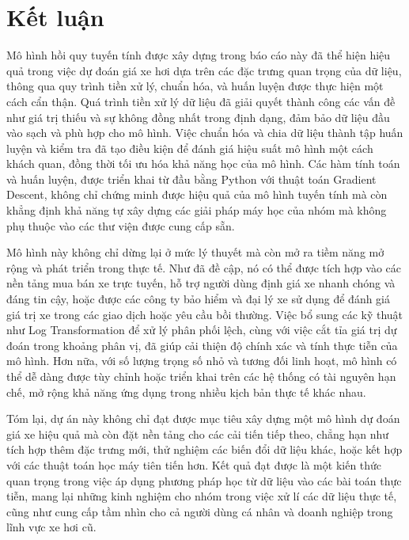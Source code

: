 \chapter{Kết luận}
\label{Chapter3}
\setcounter{secnumdepth}{5}

Mô hình hồi quy tuyến tính được xây dựng trong báo cáo này đã thể hiện hiệu quả trong việc dự đoán giá xe hơi dựa trên các đặc trưng quan trọng của dữ liệu, thông qua quy trình tiền xử lý, chuẩn hóa, và huấn luyện được thực hiện một cách cẩn thận. Quá trình tiền xử lý dữ liệu đã giải quyết thành công các vấn đề như giá trị thiếu và sự không đồng nhất trong định dạng, đảm bảo dữ liệu đầu vào sạch và phù hợp cho mô hình. Việc chuẩn hóa và chia dữ liệu thành tập huấn luyện và kiểm tra đã tạo điều kiện để đánh giá hiệu suất mô hình một cách khách quan, đồng thời tối ưu hóa khả năng học của mô hình. Các hàm tính toán và huấn luyện, được triển khai từ đầu bằng Python với thuật toán Gradient Descent, không chỉ chứng minh được hiệu quả của mô hình tuyến tính mà còn khẳng định khả năng tự xây dựng các giải pháp máy học của nhóm mà không phụ thuộc vào các thư viện được cung cấp sẵn.

Mô hình này không chỉ dừng lại ở mức lý thuyết mà còn mở ra tiềm năng mở rộng và phát triển trong thực tế. Như đã đề cập, nó có thể được tích hợp vào các nền tảng mua bán xe trực tuyến, hỗ trợ người dùng định giá xe nhanh chóng và đáng tin cậy, hoặc được các công ty bảo hiểm và đại lý xe sử dụng để đánh giá giá trị xe trong các giao dịch hoặc yêu cầu bồi thường. Việc bổ sung các kỹ thuật như Log Transformation để xử lý phân phối lệch, cùng với việc cắt tỉa giá trị dự đoán trong khoảng phân vị, đã giúp cải thiện độ chính xác và tính thực tiễn của mô hình. Hơn nữa, với số lượng trọng số nhỏ và tương đối linh hoạt, mô hình có thể dễ dàng được tùy chỉnh hoặc triển khai trên các hệ thống có tài nguyên hạn chế, mở rộng khả năng ứng dụng trong nhiều kịch bản thực tế khác nhau.

Tóm lại, dự án này không chỉ đạt được mục tiêu xây dựng một mô hình dự đoán giá xe hiệu quả mà còn đặt nền tảng cho các cải tiến tiếp theo, chẳng hạn như tích hợp thêm đặc trưng mới, thử nghiệm các biến đổi dữ liệu khác, hoặc kết hợp với các thuật toán học máy tiên tiến hơn. Kết quả đạt được là một kiến thức quan trọng trong việc áp dụng phương pháp học từ dữ liệu vào các bài toán thực tiễn, mang lại những kinh nghiệm cho nhóm trong việc xử lí các dữ liệu thực tế, cũng như cung cấp tầm nhìn cho cả người dùng cá nhân và doanh nghiệp trong lĩnh vực xe hơi cũ.